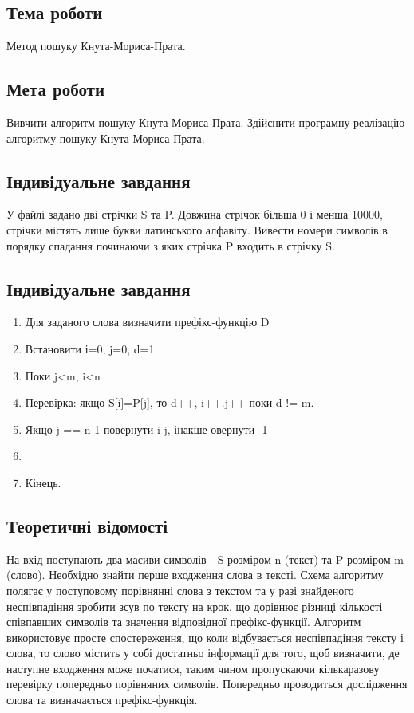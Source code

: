 \documentclass[12pt]{extarticle}
\begin{document}
\subsection*{Тема роботи} 
Метод пошуку Кнута-Мориса-Прата.

\subsection*{Мета роботи} Вивчити алгоритм пошуку Кнута-Мориса-Прата. Здійснити програмну реалізацію алгоритму пошуку Кнута-Мориса-Прата. 
\subsection*{Індивідуальне завдання}
У файлі задано дві стрічки S та P. Довжина стрічок більша 0 і менша 10000, стрічки містять лише букви латинського алфавіту. Вивести номери символів в  порядку спадання починаючи з яких стрічка P входить в стрічку S.
\subsection*{Індивідуальне завдання}

\begin{enumerate}
    
\item Для заданого слова визначити префікс-функцію D

\item Встановити і=0, j=0, d=1.

\item Поки j<m, i<n

\item Перевірка: якщо S[i]=P[j], то d++, i++.j++ поки d != m.

\item Якщо j == n-1 повернути i-j, інакше овернути -1
\item  

\item Кінець.
\end{enumerate}
\subsection*{Теоретичні відомості}
На вхід поступають два масиви символів - S розміром n (текст) та P розміром m (слово). Необхідно знайти перше входження слова в тексті. Схема алгоритму полягає у поступовому порівнянні слова з текстом та у разі знайденого неспівпадіння зробити зсув по тексту на крок, що дорівнює різниці кількості співпавших символів та значення відповідної префікс-функції. Алгоритм використовує просте спостереження, що коли відбувається неспівпадіння тексту і слова, то слово містить у собі достатньо інформації для того, щоб визначити, де наступне входження може початися, таким чином пропускаючи кількаразову перевірку попередньо порівняних символів. Попередньо проводиться дослідження слова та визначається префікс-функція.
\end{document}
